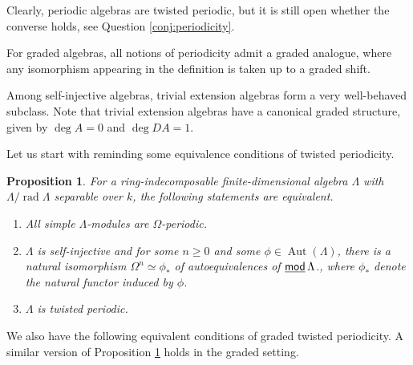 \documentclass[a4paper,reqno,11pt]{amsart}
\newtheorem{proposition}[theorem]{Proposition}
\newtheorem{conjecture}[theorem]{Conjecture}
\theoremstyle{definition}
\newcommand{\rad}{\operatorname{rad}\nolimits}
\newcommand{\Aut}{\operatorname{Aut}\nolimits}
\newcommand{\stmod}{\mathop{\underline{\mod}}\nolimits}
\newcommand{\new}[1]{{\blue #1}}
\newcommand{\old}[1]{{\red #1}}
\numberwithin{equation}{section}
\begin{document}
Clearly, periodic algebras are twisted periodic, but it is still open whether the converse holds, see Question \ref{conj:periodicity}. 



For graded algebras, all notions of periodicity admit a graded analogue, where any isomorphism appearing in the definition is taken up to a graded shift.

Among self-injective algebras, trivial extension algebras form a very well-behaved subclass.  Note that trivial extension algebras have a canonical graded structure, given by $\deg A=0$ and $\deg DA=1$.


Let us start with reminding some equivalence conditions of twisted periodicity.

\begin{proposition}{\rm \cite{GSS, H}}\label{thm:hani}
For a ring-indecomposable finite-dimensional algebra $\Lambda$ with $\Lambda/\rad\Lambda$ separable over $k$, the following statements are equivalent.
\begin{enumerate}
\item All simple $\Lambda$-modules are $\Omega$-periodic.
\item $\Lambda$ is self-injective and for some $n\geq 0$ and some $\phi\in \Aut(\Lambda)$, there is a natural isomorphism $\Omega^n\simeq \phi_*$ of autoequivalences of $\stmod \Lambda$.\old{, where $\phi_*$ denote the natural functor induced by $\phi$.} 
\item $\Lambda$ is twisted periodic.
\end{enumerate}
\end{proposition}

\new{We also have the following equivalent conditions of graded twisted periodicity.}
\old{A similar version of Proposition \ref{thm:hani} holds in the graded setting.}
\end{document}
